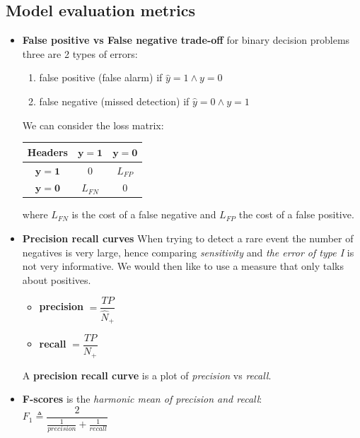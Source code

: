 \subsection{Model evaluation metrics}
\begin{itemize}
    \item \textbf{False positive vs False negative trade-off} for binary decision problems
        three are 2 types of errors:
        \begin{enumerate}
            \item {false positive} (false alarm) if $\hat{y}=1 \wedge y=0$
            \item {false negative} (missed detection) if $\hat{y}=0 \wedge y=1$
        \end{enumerate}
        We can consider the loss matrix:\\
        \begin{tabular}{|*{3}{c|}}
            \hline
            \textbf{Headers} & $\bm{y=1}$ & $\bm{y=0}$\\
            \hline
            $\bm{\hat{y}=1}$ & 0 & $L_{FP}$\\
            \hline
            $\bm{\hat{y}=0}$ & $L_{FN}$ & 0\\
            \hline
        \end{tabular}
        where $L_{FN}$ is the cost of a false negative and $L_{FP}$ the cost of a false
        positive.

    \item \textbf{Precision recall curves}
        When trying to detect a rare event the number of negatives is very large, hence
        comparing \emph{sensitivity} and \emph{the error of type I} is not very 
        informative. We would then like to use a measure that only talks about positives.
        \begin{itemize}
            \item \textbf{precision} $=\dfrac{TP}{\hat{N}_{+}}$
            \item \textbf{recall} $=\dfrac{TP}{N_{+}}$
        \end{itemize}
        A \textbf{precision recall curve} is a plot of \textit{precision} vs 
        \textit{recall}.
    \item \textbf{F-scores} is the \emph{harmonic mean of precision and recall}:\\
        $F_{1} \triangleq \dfrac{2}{\frac{1}{precision} + \frac{1}{recall}}$
\end{itemize}


